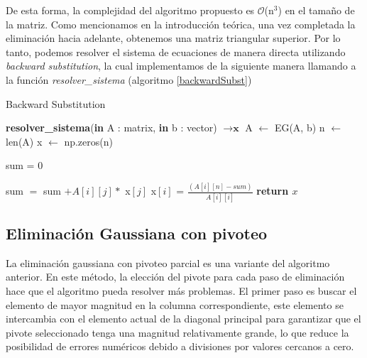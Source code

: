 De esta forma, la complejidad del algoritmo propuesto es $\mathcal{O}$(n$^3$) en el tamaño de la matriz.
Como mencionamos en la introducción teórica, una vez completada la eliminación hacia adelante, obtenemos una matriz triangular superior. Por lo tanto, podemos resolver el sistema de ecuaciones de manera directa utilizando \textit{backward substitution}, la cual implementamos de la siguiente manera llamando a la función \textit{resolver\_sistema} (algoritmo \ref{backwardSubst})

\begin{algorithm}
\caption{Backward Substitution}\label{backwardSubst}
\begin{algorithmic}
\State \textbf{resolver\_sistema}(\textbf{in} A : matrix, \textbf{in} b : vector) $\to \textbf{x}$
 \State A $\gets$ EG(A, b) 
\State n $\gets$ len(A)
\State x $\gets$ np.zeros(n)

    \State sum = 0
        
            \State sum $=$ sum $+ A[i][j] *$ x$[j]$
        \EndIf       
        \State x$[i]$ = $\frac{(A[i][n] - sum)}{A[i][i]}$
    \EndFor
\EndFor
\State \textbf{return $x$}
\end{algorithmic}
\end{algorithm}

\subsection{Eliminación Gaussiana con pivoteo} \label{seccion_EG_pivot}
La eliminación gaussiana con pivoteo parcial es una variante del algoritmo anterior.
En este método, la elección del pivote para cada paso de eliminación hace que el algoritmo pueda resolver más problemas. El primer paso es buscar el elemento de mayor magnitud en la columna correspondiente, este elemento se intercambia con el elemento actual de la diagonal principal para garantizar que el pivote seleccionado tenga una magnitud relativamente grande, lo que reduce la posibilidad de errores numéricos debido a divisiones por valores cercanos a cero.

